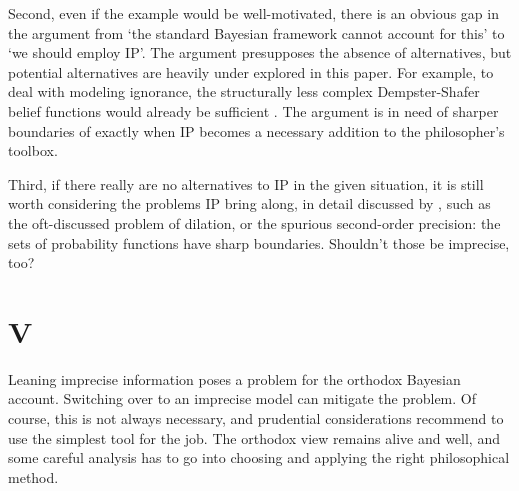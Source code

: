 \documentclass[11pt, a4paper]{scrartcl}
\begin{document}
Second, even if the example would be well-motivated, there is an obvious gap in the argument from `the standard Bayesian framework cannot account for this' to `we should employ IP'. The argument presupposes the absence of alternatives, but potential alternatives are heavily under explored in this paper. For example, to deal with modeling ignorance, the structurally less complex Dempster-Shafer belief functions would already be sufficient \citep{Shafer1976-SHAAMT, Norton2011-NORCTB}. The argument is in need of sharper boundaries of exactly when IP becomes a necessary addition to the philosopher's toolbox.

Third, if there really are no alternatives to IP in the given situation, it is still worth considering the problems IP bring along, in detail discussed by \citep{sep-imprecise-probabilities}, such as the oft-discussed problem of dilation, or the spurious second-order precision: the sets of probability functions have sharp boundaries. Shouldn't those be imprecise, too?  

\section{V}

Leaning imprecise information poses a problem for the orthodox Bayesian account. Switching over to an imprecise model can mitigate the problem. Of course, this is not always necessary, and prudential considerations recommend to use the simplest tool for the job. The orthodox view remains alive and well, and some careful analysis has to go into choosing and applying the right philosophical method. 


\begin{singlespacing}
\printbibliography{}
\end{singlespacing}
\end{document}
